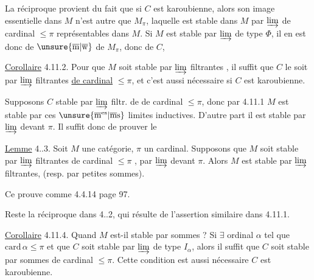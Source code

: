 La réciproque provient du fait que si $C$ est karoubienne, alors son image essentielle dans $M$ n'est autre que $M_\pi$, laquelle est stable dans $M$ par  $\varinjlim$ de cardinal $\leq\pi$ représentables dans $M$.  Si $M$ est stable par $\varinjlim$ de type $\Phi$, il en est donc de $\unsure{\overline{\mathrm m}|\overline{\mathrm w}}$ de $M_\pi$, donc de $C$, 

\uline{Corollaire} 4.11.2. Pour que $M$ soit stable par $\varinjlim$ filtrantes , il suffit que $C$ le soit par $\varinjlim$ filtrantes  \uline{de cardinal} $\leq\pi$, et c'est aussi nécessaire si $C$ est karoubienne.

Supposons $C$ stable par $\varinjlim$ filtr. de
 de cardinal $\leq\pi$, donc par 4.11.1 $M$ est stable par ces $\unsure{\overline{\mathrm m}^{\mathrm{es}}|\overline{\mathrm m}\mathrm s}$  limites inductives.  D'autre part il est stable par $\varinjlim$  devant $\pi$. Il suffit donc de prouver le

\uline{Lemme} 4..3. Soit $M$ une catégorie, $\pi$ un cardinal. Supposons que $M$ soit stable par $\varinjlim$ filtrantes de cardinal $\leq\pi$ ,  par $\varinjlim$  devant $\pi$. Alors $M$ est stable par  $\varinjlim$ filtrantes, (resp. par   petites sommes).

Ce  prouve comme 4.4.14 page 97.

Reste la réciproque dans 4..2, qui résulte de l'assertion similaire dans 4.11.1.

\uline{Corollaire} 4.11.4. Quand $M$ est-il stable par sommes ? Si $\exists$ ordinal $\alpha$ tel que $\mathrm{card}\,\alpha\leq\pi$ et que $C$ soit stable par $\varinjlim$ de type $I_\alpha$, alors il suffit que $C$ soit stable par sommes de cardinal $\leq\pi$. Cette condition est aussi nécessaire  $C$ est karoubienne.


